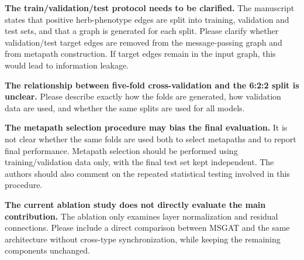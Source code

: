 \documentclass[11pt,american]{article}
\begin{document}
\begin{revcomment}
\textbf{The train/validation/test protocol needs to be clarified.} The manuscript states that positive herb-phenotype edges are split into training, validation and test sets, and that a graph is generated for each split. Please clarify whether validation/test target edges are removed from the message-passing graph and from metapath construction. If target edges remain in the input graph, this would lead to information leakage.
\end{revcomment}

\begin{revresponse}

\end{revresponse}

\begin{revcomment}
\textbf{The relationship between five-fold cross-validation and the 6:2:2 split is unclear.} Please describe exactly how the folds are generated, how validation data are used, and whether the same splits are used for all models.
\end{revcomment}

\begin{revresponse}

\end{revresponse}

\begin{revcomment}
\textbf{The metapath selection procedure may bias the final evaluation.} It is not clear whether the same folds are used both to select metapaths and to report final performance. Metapath selection should be performed using training/validation data only, with the final test set kept independent. The authors should also comment on the repeated statistical testing involved in this procedure.
\end{revcomment}

\begin{revresponse}

\end{revresponse}

\begin{revcomment}
\textbf{The current ablation study does not directly evaluate the main contribution.} The ablation only examines layer normalization and residual connections. Please include a direct comparison between MSGAT and the same architecture without cross-type synchronization, while keeping the remaining components unchanged.
\end{revcomment}
\end{document}

